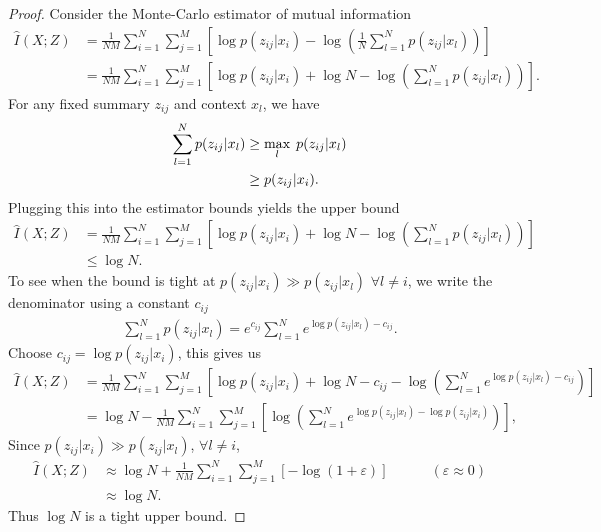\documentclass{article} %
\begin{document}
\begin{proof}
Consider the Monte-Carlo estimator of mutual information
\begin{align*}
    \hat{I}(X;Z) &= \frac{1}{NM} \sum_{i=1}^{N} \sum_{j=1}^{M} \left[ \log p(z_{ij} | x_i) - \log \left( \frac{1}{N} \sum_{l=1}^{N} p(z_{ij} | x_l) \right) \right] \\
    &= \frac{1}{NM} \sum_{i=1}^{N} \sum_{j=1}^{M} \left[ \log p(z_{ij} | x_i) + \log N - \log \left( \sum_{l=1}^{N} p(z_{ij} | x_l) \right) \right].
\end{align*}
For any fixed summary $z_{ij}$ and context $x_l$, we have
\begin{align*}
    \sum_{l=1}^{N} p(z_{ij} | x_l) &\geq \max_{l} \hspace{0.25em} p(z_{ij} | x_l) \\ 
    &\geq p(z_{ij} | x_i).
\end{align*}
Plugging this into the estimator bounds yields the upper bound
\begin{align*}
    \hat{I}(X;Z) &= \frac{1}{NM} \sum_{i=1}^{N} \sum_{j=1}^{M} \left[ \log p(z_{ij} | x_i) + \log N - \log \left( \sum_{l=1}^{N} p(z_{ij} | x_l) \right) \right] \\
    &\leq \log N.
\end{align*}
\noindent To see when the bound is tight at $p(z_{ij} | x_i) \gg p(z_{ij} | x_l)$ $\forall l \neq i$, we write the denominator using a constant $c_{ij}$
\begin{align*}
    \sum_{l=1}^{N} p(z_{ij} | x_l) = e^{c_{ij}}\sum_{l=1}^{N} e^{\log p(z_{ij} | x_l) - c_{ij}}.
\end{align*}
\noindent Choose $c_{ij} = \log p(z_{ij} | x_i)$, this gives us
\begin{align*}
    \hat{I}(X;Z) &= \frac{1}{NM} \sum_{i=1}^{N} \sum_{j=1}^{M} \left[ \log p(z_{ij} | x_i) + \log N - c_{ij} - \log \left( \sum_{l=1}^{N} e^{\log p(z_{ij} | x_l) - c_{ij}}\right) \right] \\
    &= \log N - \frac{1}{NM} \sum_{i=1}^{N} \sum_{j=1}^{M} \left[ \log \left( \sum_{l=1}^{N} e^{\log p(z_{ij} | x_l) - \log p(z_{ij} | x_i)}\right) \right],
\end{align*}
Since $p(z_{ij} | x_i) \gg p(z_{ij} | x_l)$, $\forall l \neq i$, 
\begin{align*}
    \hat{I}(X;Z) &\approx \log N + \frac{1}{NM} \sum_{i=1}^{N} \sum_{j=1}^{M} \left[ - \log \left(1 + \varepsilon \right) \right] \hspace{3em} (\varepsilon \approx 0)\\ 
    &\approx \log N.
\end{align*}
Thus $\log N$ is a tight upper bound.
\end{proof}
\end{document}
